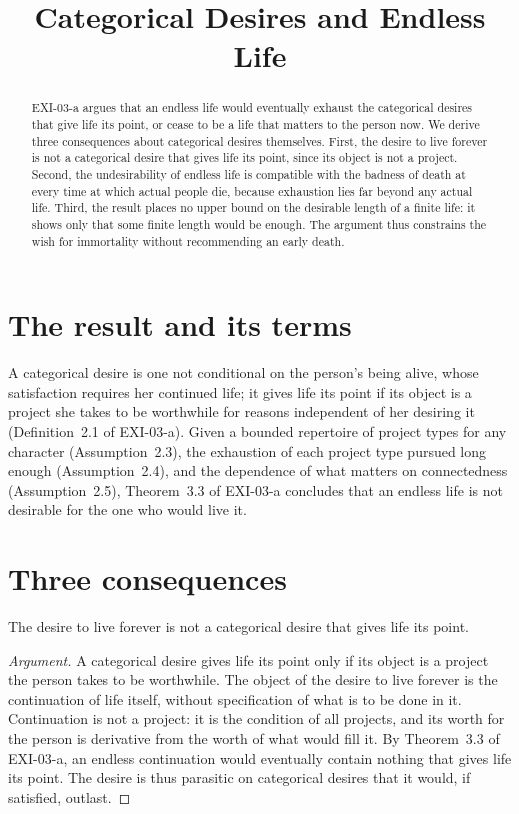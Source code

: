 \documentclass{situationist-preprint}
\title{Categorical Desires and Endless Life}
\begin{document}
\maketitle

\begin{abstract}
EXI-03-a argues that an endless life would eventually exhaust the categorical desires that give life its point, or cease to be a life that matters to the person now. We derive three consequences about categorical desires themselves. First, the desire to live forever is not a categorical desire that gives life its point, since its object is not a project. Second, the undesirability of endless life is compatible with the badness of death at every time at which actual people die, because exhaustion lies far beyond any actual life. Third, the result places no upper bound on the desirable length of a finite life: it shows only that some finite length would be enough. The argument thus constrains the wish for immortality without recommending an early death.
\end{abstract}

\section{The result and its terms}

A categorical desire is one not conditional on the person's being alive, whose satisfaction requires her continued life; it gives life its point if its object is a project she takes to be worthwhile for reasons independent of her desiring it (Definition~2.1 of EXI-03-a). Given a bounded repertoire of project types for any character (Assumption~2.3), the exhaustion of each project type pursued long enough (Assumption~2.4), and the dependence of what matters on connectedness (Assumption~2.5), Theorem~3.3 of EXI-03-a concludes that an endless life is not desirable for the one who would live it.

\section{Three consequences}

\begin{proposition}\label{p:wish}
The desire to live forever is not a categorical desire that gives life its point.
\end{proposition}

\begin{proof}[Argument]
A categorical desire gives life its point only if its object is a project the person takes to be worthwhile. The object of the desire to live forever is the continuation of life itself, without specification of what is to be done in it. Continuation is not a project: it is the condition of all projects, and its worth for the person is derivative from the worth of what would fill it. By Theorem~3.3 of EXI-03-a, an endless continuation would eventually contain nothing that gives life its point. The desire is thus parasitic on categorical desires that it would, if satisfied, outlast.
\end{proof}
\end{document}
